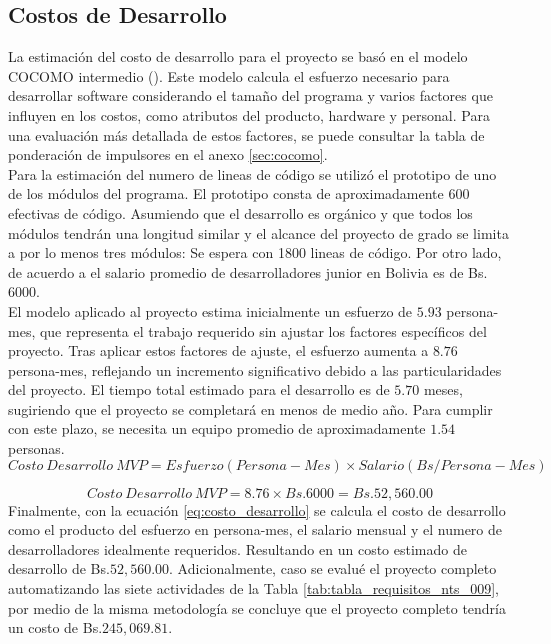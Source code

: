 \subsection{Costos de Desarrollo}
La estimación del costo de desarrollo para el proyecto se basó en el modelo COCOMO intermedio (\cite{basavaraj2008empirical}). Este modelo calcula el esfuerzo necesario para desarrollar software considerando el tamaño del programa y varios factores que influyen en los costos, como atributos del producto, hardware y personal. Para una evaluación más detallada de estos factores, se puede consultar la tabla de ponderación de impulsores en el anexo \ref{sec:cocomo}. \\
Para la estimación del numero de lineas de código se utilizó el prototipo de uno de los módulos del programa. El prototipo consta de aproximadamente 600  efectivas de código. Asumiendo que el desarrollo es orgánico y que todos los módulos tendrán una longitud similar y el alcance del proyecto de grado se limita a por lo menos tres módulos: Se espera con 1800 lineas de código. Por otro lado, de acuerdo a \textcite{glassdoor2024} el salario promedio de desarrolladores junior en Bolivia es de Bs. 6000.\\ \indent
El modelo aplicado al proyecto estima inicialmente un esfuerzo de $5.93$ persona-mes, que representa el trabajo requerido sin ajustar los factores específicos del proyecto. Tras aplicar estos factores de ajuste, el esfuerzo aumenta a $8.76$ persona-mes, reflejando un incremento significativo debido a las particularidades del proyecto. El tiempo total estimado para el desarrollo es de $5.70$ meses, sugiriendo que el proyecto se completará en menos de medio año. Para cumplir con este plazo, se necesita un equipo promedio de aproximadamente $1.54$ personas. \\
\begin{equation}\label{eq:costo_desarrollo}
    Costo\ Desarrollo\ MVP = Esfuerzo(Persona-Mes) \times Salario(Bs/Persona-Mes)
\end{equation}

\begin{equation*}
    Costo\ Desarrollo\ MVP = 8.76 \times Bs.6000 = Bs.52,560.00
\end{equation*}
Finalmente, con la ecuación \ref{eq:costo_desarrollo} se calcula el costo de desarrollo como el producto del esfuerzo en persona-mes, el salario mensual y el numero de desarrolladores idealmente requeridos. Resultando en un costo estimado de desarrollo de Bs.$52,560.00$. Adicionalmente, caso se evalué el proyecto completo automatizando las siete actividades de la Tabla \ref{tab:tabla_requisitos_nts_009}, por medio de la misma metodología se concluye que el proyecto completo tendría un costo de Bs.$245,069.81$.


